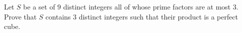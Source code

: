 Let $S$ be a set of $9$ distinct integers all of whose prime factors are at most $3$. Prove that $S$ contains $3$ distinct integers such that their product is a perfect cube.